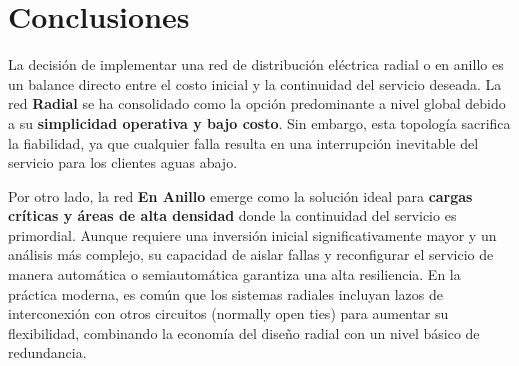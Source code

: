 \section{Conclusiones}

La decisión de implementar una red de distribución eléctrica radial o en anillo es un balance directo entre el costo inicial y la continuidad del servicio deseada. La red \textbf{Radial} se ha consolidado como la opción predominante a nivel global debido a su \textbf{simplicidad operativa y bajo costo}. Sin embargo, esta topología sacrifica la fiabilidad, ya que cualquier falla resulta en una interrupción inevitable del servicio para los clientes aguas abajo.

Por otro lado, la red \textbf{En Anillo} emerge como la solución ideal para \textbf{cargas críticas y áreas de alta densidad} donde la continuidad del servicio es primordial. Aunque requiere una inversión inicial significativamente mayor y un análisis más complejo, su capacidad de aislar fallas y reconfigurar el servicio de manera automática o semiautomática garantiza una alta resiliencia. En la práctica moderna, es común que los sistemas radiales incluyan lazos de interconexión con otros circuitos (normally open ties) para aumentar su flexibilidad, combinando la economía del diseño radial con un nivel básico de redundancia.
